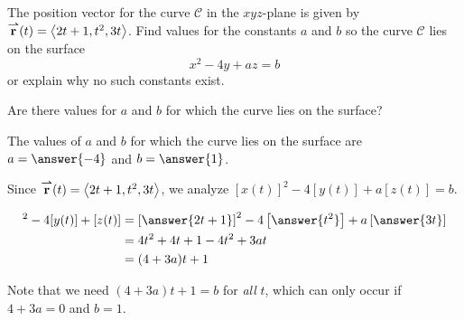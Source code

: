 \documentclass{ximera}
\author{Jim Talamo}
\begin{document}
\begin{exercise}
The position vector for the curve $\mathcal{C}$ in the $xyz$-plane is given by ${\overset{\boldsymbol{\rightharpoonup}}{\mathbf{r}}} (t) = \left\langle 2t+1, t^2, 3t\right\rangle$. Find values for the constants $a$ and $b$ so the curve $\mathcal{C}$ lies on the surface $$x^2-4y +az = b$$ or explain why no such constants exist.

Are there values for $a$ and $b$ for which the curve lies on the surface?

\begin{multipleChoice}
\end{multipleChoice}

\begin{exercise}
The values of $a$ and $b$ for which the curve lies on the surface are $a=\answer{-4 }$ and $b=\answer{ 1 }$.


\begin{hint}

Since ${\overset{\boldsymbol{\rightharpoonup}}{\mathbf{r}}} (t) = \left\langle 2t+1, t^2, 3t\right\rangle$, we analyze $[x(t)]^2-4[y(t)] + a[z(t)] = b.$

\begin{align*}
[x(t)]^2-4[y(t)] + [z(t)] & = \left[\answer{2t+1}\right]^2-4\left[\answer{t^2}\right] +a \left[\answer{3t}\right] \\
&= 4t^2+4t+1 -4t^2+3at \\
& = (4+3a)t+1
\end{align*}

Note that we need $(4+3a)t+1 = b$ for \emph{all} $t$, which can only occur if $4+3a=0$ and $b=1$.

\end{hint}
\end{exercise}

\end{exercise}
\end{document}
